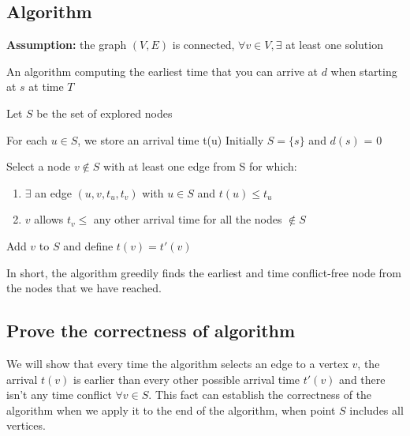 \documentclass{article}
\begin{document}
\subsection{Algorithm}
\begin{algorithm}
\textbf{Assumption:} the graph $(V,E)$ is connected, $\forall v \in V, \exists$ at least one solution
    \caption{An algorithm computing the earliest time that you can arrive at $d$ when starting at $s$ at time $T$}\label{alg:cap}
    \begin{algorithmic}
    \State Let $S$ be the set of explored nodes

    For each $u\in S$, we store an arrival time t(u)
    \State Initially $S = \{s\}$ and $d(s)$ = 0

        \State Select a node $v\not\in S$ with at least one edge from S for which:
        \begin{enumerate}
            \item $\exists$ an edge $(u,v,t_u,t_v)$ with $u \in S$ and $t(u) \leq t_u$
            \item $v$ allows $t_v \leq$ any other arrival time for all the nodes $\not\in S$
        \end{enumerate}
        
        \State Add $v$ to $S$ and define $t(v) = t'(v)$
    \EndWhile
    \end{algorithmic}
    \end{algorithm}

In short, the algorithm greedily finds the earliest and time conflict-free node from the nodes that we have reached.

\subsection{Prove the correctness of algorithm}

We will show that every time the algorithm selects an edge to a vertex $v$, the arrival $t(v)$ is earlier than every other possible arrival time $t'(v)$ and there isn't any time conflict $\forall v\in S$. This fact can establish the correctness of the algorithm when we apply it to the end of the algorithm, when point $S$ includes all vertices. 
\end{document}
